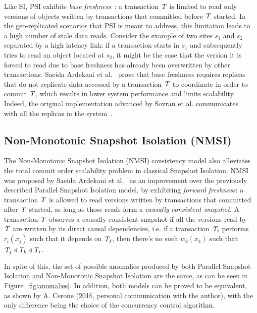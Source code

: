 Like SI, PSI exhibits \emph{base freshness}~\citep{ardekani_freshness}: a transaction $\mathit{T}$ is limited to read only versions of objects written by transactions that committed before $\mathit{T}$ started. In the geo-replicated scenarios that PSI is meant to address, this limitation leads to a high number of stale data reads. Consider the example of two sites $s_1$ and $s_2$ separated by a high latency link: if a transaction starts in $s_1$ and subsequently tries to read an object located at $s_2$, it might be the case that the version it is forced to read due to base freshness has already been overwritten by other transactions. Saeida Ardekani et al.~\citep[Theorem 4]{ardekani_si_limits} prove that base freshness requires replicas that do not replicate data accessed by a transaction $\mathit{T}$ to coordinate in order to commit $\mathit{T}$, which results in lower system performance and limits scalability. Indeed, the original implementation advanced by Sovran et al. communicates with all the replicas in the system~\citep{psi-intro}.

\subsection{Non-Monotonic Snapshot Isolation (NMSI)}
\label{sect:nmsi}

The Non-Monotonic Snapshot Isolation (NMSI) consistency model also alleviates the total commit order scalability problem in classical Snapshot Isolation. NMSI was proposed by Saeida Ardekani et al.~\citep{ardekani_nmsi} as an improvement over the previously described Parallel Snapshot Isolation model, by exhibiting \emph{forward freshness}: a transaction $\mathit{T}$ is allowed to read versions written by transactions that committed after $\mathit{T}$ started, as long as those reads form a \emph{causally consistent snapshot}. A transaction $\mathit{T}$ observes a causally consistent snapshot if all the versions read by $\mathit{T}$ are written by its direct causal dependencies, i.e. if a transaction $\mathit{T}_i$ performs $r_i(x_j)$ such that it depends on $\mathit{T}_j$, then there's no such $w_k(x_k)$ such that $\mathit{T}_j \triangleleft \mathit{T}_k \triangleleft \mathit{T}_i$.

In spite of this, the set of possible anomalies produced by both Parallel Snapshot Isolation and Non-Monotonic Snapshot Isolation are the same, as can be seen in Figure~\ref{fig:anomalies}. In addition, both models can be proved to be equivalent, as shown by A. Cerone (2016, personal communication with the author), with the only difference being the choice of the concurrency control algorithm.

